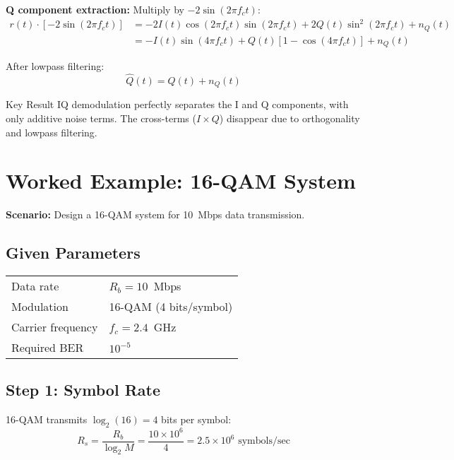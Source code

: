 \textbf{Q component extraction:} Multiply by $-2\sin(2\pi f_c t)$:
\begin{equation}
\begin{aligned}
r(t) \cdot [-2\sin(2\pi f_c t)] &= -2I(t)\cos(2\pi f_c t)\sin(2\pi f_c t) + 2Q(t)\sin^2(2\pi f_c t) + n_Q(t) \\
&= -I(t)\sin(4\pi f_c t) + Q(t)[1 - \cos(4\pi f_c t)] + n_Q(t)
\end{aligned}
\end{equation}

After lowpass filtering:
\begin{equation}
\hat{Q}(t) = Q(t) + n_Q(t)
\end{equation}

\begin{calloutbox}{Key Result}
IQ demodulation perfectly separates the I and Q components, with only additive noise terms. The cross-terms ($I \times Q$) disappear due to orthogonality and lowpass filtering.
\end{calloutbox}

\section{Worked Example: 16-QAM System}

\textbf{Scenario:} Design a 16-QAM system for 10~Mbps data transmission.

\subsection*{Given Parameters}

\begin{tabular}{@{}ll@{}}
Data rate & $R_b = 10$~Mbps \\
Modulation & 16-QAM (4 bits/symbol) \\
Carrier frequency & $f_c = 2.4$~GHz \\
Required BER & $10^{-5}$ \\
\end{tabular}

\subsection*{Step 1: Symbol Rate}

16-QAM transmits $\log_2(16) = 4$ bits per symbol:
\begin{equation}
R_s = \frac{R_b}{\log_2 M} = \frac{10 \times 10^6}{4} = 2.5 \times 10^6 \text{ symbols/sec}
\end{equation}

